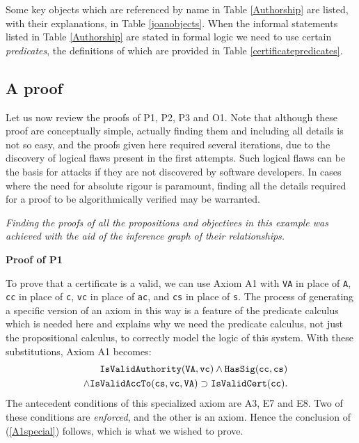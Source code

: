 Some key objects which are referenced by name in Table \ref{Authorship} are
listed, with their explanations, in Table \ref{joanobjects}. When the informal
statements listed in Table \ref{Authorship} are stated in formal logic we need
to use certain {\em predicates}, the definitions of which are provided in Table \ref{certificatepredicates}.





\subsection{A proof}
Let us now review the proofs of P1, P2, P3 and O1.
Note that although these proof are conceptually simple, 
actually finding them and including all details is not
so easy, and the proofs given here required several iterations,
due to the discovery of logical flaws present in the first attempts.
Such logical flaws can be the basis for attacks if they are not 
discovered by software developers. 
In cases where the need for absolute rigour
is paramount, finding all the details required for a proof to be algorithmically
verified may be warranted.

{\em Finding the proofs of all the propositions and objectives in
this example was achieved with the aid of the inference graph of
their relationships.}

{\bf Proof of P1}


To prove that a certificate is a valid, we can use Axiom A1
with {\tt VA} in place of {\tt A}, {\tt cc} in place of {\tt c}, 
{\tt vc} in place of {\tt ac}, 
and {\tt cs} in place of {\tt s}.
The process of generating a specific version of an axiom in this way
is a feature of the predicate calculus which is needed here and explains
why we need the predicate calculus, not just the propositional calculus,
to correctly model the logic of this system. With these substitutions,
Axiom A1 becomes:
\begin{eqnarray}\label{A2specific}\label{A1special}
&&	\hbox{\tt IsValidAuthority}({\tt VA},{\tt vc}) \wedge \hbox{\tt HasSig}({\tt cc},{\tt cs}) \\ 
&&\wedge \hbox{\tt IsValidAccTo}({\tt cs}, {\tt vc}, {\tt VA} ) \nonumber
\supset \hbox{\tt IsValidCert}({\tt cc}).
\end{eqnarray}
The antecedent conditions of this specialized axiom are
A3, E7 and E8. Two of these conditions are {\em enforced}, and the other is
an axiom. Hence the conclusion of (\ref{A1special}) follows, which
is what we wished to prove.

